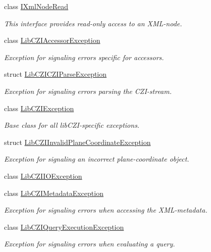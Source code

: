 \begin{DoxyCompactItemize}
class \hyperlink{classlib_c_z_i_1_1_i_xml_node_read}{I\+Xml\+Node\+Read}
\begin{DoxyCompactList}\small\item\em This interface provides read-\/only access to an X\+M\+L-\/node. \end{DoxyCompactList}\item 
class \hyperlink{classlib_c_z_i_1_1_lib_c_z_i_accessor_exception}{Lib\+C\+Z\+I\+Accessor\+Exception}
\begin{DoxyCompactList}\small\item\em Exception for signaling errors specific for accessors. \end{DoxyCompactList}\item 
struct \hyperlink{structlib_c_z_i_1_1_lib_c_z_i_c_z_i_parse_exception}{Lib\+C\+Z\+I\+C\+Z\+I\+Parse\+Exception}
\begin{DoxyCompactList}\small\item\em Exception for signaling errors parsing the C\+Z\+I-\/stream. \end{DoxyCompactList}\item 
class \hyperlink{classlib_c_z_i_1_1_lib_c_z_i_exception}{Lib\+C\+Z\+I\+Exception}
\begin{DoxyCompactList}\small\item\em Base class for all lib\+C\+Z\+I-\/specific exceptions. \end{DoxyCompactList}\item 
struct \hyperlink{structlib_c_z_i_1_1_lib_c_z_i_invalid_plane_coordinate_exception}{Lib\+C\+Z\+I\+Invalid\+Plane\+Coordinate\+Exception}
\begin{DoxyCompactList}\small\item\em Exception for signaling an incorrect plane-\/coordinate object. \end{DoxyCompactList}\item 
class \hyperlink{classlib_c_z_i_1_1_lib_c_z_i_i_o_exception}{Lib\+C\+Z\+I\+I\+O\+Exception}
\item 
class \hyperlink{classlib_c_z_i_1_1_lib_c_z_i_metadata_exception}{Lib\+C\+Z\+I\+Metadata\+Exception}
\begin{DoxyCompactList}\small\item\em Exception for signaling errors when accessing the X\+M\+L-\/metadata. \end{DoxyCompactList}\item 
class \hyperlink{classlib_c_z_i_1_1_lib_c_z_i_query_execution_exception}{Lib\+C\+Z\+I\+Query\+Execution\+Exception}
\begin{DoxyCompactList}\small\item\em Exception for signaling errors when evaluating a query. \end{DoxyCompactList}\item 

\end{DoxyCompactItemize}
